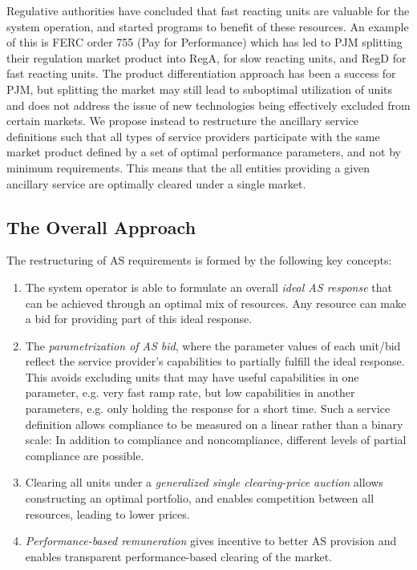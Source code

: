Regulative authorities have concluded that fast reacting units are valuable for the system operation, and started programs to benefit of these resources. An example of this is FERC order 755 (Pay for Performance) which has led to PJM splitting their regulation market product into RegA, for slow reacting units, and RegD for fast reacting units. The product differentiation approach has been a success for PJM, but  splitting the market may still lead to suboptimal utilization of units and does not address the issue of new technologies being effectively excluded from certain markets.  We propose instead to restructure the ancillary service definitions such that all types of service providers participate with the same market product defined by a set of optimal performance parameters, and not by minimum requirements. This means that the all entities providing a given ancillary service are optimally cleared under a single market.

\subsection{The Overall Approach} %
\label{sub:TheOverallApproach}
The restructuring of AS requirements is formed by the following key concepts:
\begin{enumerate}
	\item The system operator is able to formulate an overall \emph{ideal AS response} that can be achieved through an optimal mix of resources. Any resource can make a bid for providing part of this ideal response.
	\item The \emph{parametrization of AS bid}, where the parameter values of each unit/bid reflect the service provider's capabilities to partially fulfill the ideal response. This avoids excluding units that may have useful capabilities in one parameter, e.g. very fast ramp rate, but low capabilities in another parameters, e.g. only holding the response for a short time. Such a service definition allows compliance to be measured on a linear rather than a binary scale: In addition to compliance and noncompliance, different levels of partial compliance are possible.
	\item Clearing all units under a \emph{generalized single clearing-price auction} allows constructing an optimal portfolio, and enables competition between all resources, leading to lower prices.
    \item \emph{Performance-based remuneration} gives incentive to better AS provision and enables transparent performance-based clearing of the market.
\end{enumerate}

